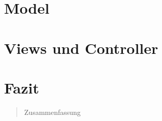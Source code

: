 \documentclass[a4paper, abstracton]{scrartcl}
\begin{document}
\section{Model}

  

\section{Views und Controller}

\section{Fazit}

\begin{abstract}
Zusammenfassung
\end{abstract}
\pagebreak
\tableofcontents	%
\pagebreak
\listoffigures		%

\pagebreak	%


\pagebreak


\pagebreak	
\end{document}

